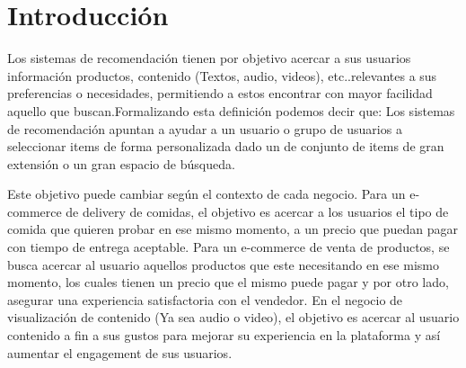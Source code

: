 \documentclass[11pt,a4paper,twoside]{thesis}
\begin{document}

\def\autor{Adrian Norberto Marino}
\def\tituloTesis{Sistemas de recomendación colaborativos e híbridos}
\def\runtitulo{Resumen}
\def\runtitle{Sistemas de recomendación colaborativos e híbridos}
\def\lugar{Buenos Aires, 2022}

%
\frontmatter
\pagestyle{empty}





\tableofcontents

\mainmatter
\pagestyle{headings}



\chapter{Introducción}

Los sistemas de recomendación tienen por objetivo acercar a sus usuarios información productos, contenido (Textos,  audio, videos), etc..relevantes a sus preferencias o necesidades, permitiendo a estos encontrar con mayor facilidad aquello que buscan.Formalizando esta definición podemos decir que:  Los sistemas de recomendación apuntan a ayudar a un usuario o grupo de usuarios a seleccionar items de forma personalizada dado un de conjunto de items de gran extensión o un gran espacio de búsqueda.

Este objetivo puede cambiar según el contexto de cada negocio. Para un e-commerce de delivery de comidas, el objetivo es acercar a los usuarios el tipo de comida que quieren probar en ese mismo momento, a un precio que puedan pagar con tiempo de entrega aceptable. Para un e-commerce de venta de productos, se busca acercar al usuario aquellos productos que este necesitando en ese mismo momento, los cuales tienen un precio que el mismo puede pagar y por otro lado, asegurar una experiencia satisfactoria con el vendedor. En el negocio de visualización de contenido (Ya sea audio o video), el objetivo es acercar al usuario contenido a fin a sus gustos para mejorar su experiencia en la plataforma y así aumentar el engagement de sus usuarios.
\end{document}
